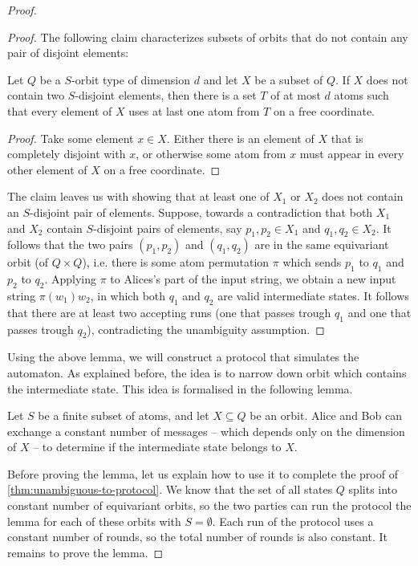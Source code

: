 \begin{proof}
\begin{proof}
The following claim characterizes subsets of orbits that do not contain any pair of disjoint elements:
\begin{claim}\label{claim:sunflower}
        Let $Q$ be a $S$-orbit type of dimension $d$ and let $X$ be a subset of $Q$.
        If $X$ does not contain two $S$-disjoint elements, then there is a
        set $T$ of at most $d$ atoms such that every element of $X$ uses at last one atom from $T$ on a free coordinate.
\end{claim}
\begin{proof}
        Take some element $x \in X$. Either there is an element of $X$ that is completely disjoint with $x$, or otherwise some atom from $x$ must appear in every other element of $X$ on a free coordinate.
\end{proof}

The claim leaves us with showing that at least one of $X_1$ or $X_2$ does not contain an $S$-disjoint pair of elements.
Suppose, towards a contradiction that both $X_1$ and $X_2$ contain $S$-disjoint pairs of elements, 
say $p_1, p_2 \in X_1$ and $q_1, q_2 \in X_2$. It follows that the two pairs $(p_1,p_2)$ and $(q_1,q_2)$ are
in the same equivariant orbit (of $Q \times Q$), i.e. there is some atom permutation $\pi$ which sends $p_1$ to $q_1$ and $p_2$ to $q_2$.
Applying $\pi$ to Alices's part of the input string, we obtain a new input string $\pi(w_1) w_2$, 
in which both $q_1$ and $q_2$ are valid intermediate states. It follows that
there are at least two accepting runs (one that passes trough $q_1$ and one that passes trough $q_2$),
contradicting the unambiguity assumption. 
\end{proof}

Using the above lemma, we will construct a protocol that simulates the automaton. As explained before, the idea is to narrow down orbit which contains the intermediate state. This idea is formalised in the following lemma. 


\begin{lemma}\label{lem:narrow-down-orbit}
    Let $S$ be a finite subset of atoms, and let $X \subseteq Q$ be an orbit. Alice and Bob can exchange a constant number of messages -- which depends only on the dimension of $X$ -- to determine if the intermediate state belongs to $X$. 
\end{lemma}

Before proving the lemma, let us explain how to use it to complete the proof of \cref{thm:unambiguous-to-protocol}.
We know that the set of all states $Q$ splits into constant number of equivariant orbits, so the two
parties can run the protocol the lemma for each of these orbits with $S=\emptyset$.
Each run of the protocol uses a constant number of rounds, so the total number of rounds is also constant.
It remains to prove the lemma.


\end{proof}
